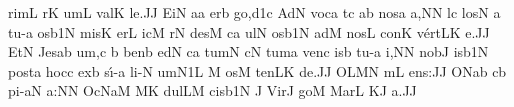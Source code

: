 \sgn rim\punctum L\egn
{}r\punctum K\egn
\sgn {}um\punctum L\egn
\spatium
\sgn v{a}l\punctum K\egn
\sgn le.\punctum J\augmentum J\egn
\spatium
\divisiofinalis
\spatium
\sgn {}Ei\punctum N\egn
\sgn {}a{}\punctum a\egn
\spatium
\sgn {}er\punctum b\egn
\sgn go,\episem d1\punctum c\egn
\spatium
\sgn {}Ad\punctum N\egn
\sgn voc\punctum a\egn
{}t\punctum c\egn
\sgn {}a{}\punctum b\egn
\spatium
\sgn n{o}s\punctum a\egn
{}a,\punctum N\augmentum N\egn
\spatium
\divisiominor
\spatium
l\punctum c\egn
\sgn los\punctum N\egn
\spatium
\custos a\lineaproxima
\sgn t{u}-\punctum a\egn
\sgn {}os\episem b1\punctum N\egn
\spatium
\sgn mis\punctum K\egn
\sgn {}er\punctum L\egn
\sgn {}ic\punctum M\egn
{}r\punctum N\egn
\sgn des\punctum M\egn
\spatium
{}c\punctum a\egn
\sgn {}ul\punctum N\egn
\sgn {}os\episem b1\punctum N\egn
\spatium
\virgula
\spatium
\sgn {}ad\punctum M\egn
\spatium
\sgn nos\punctum L\egn
\spatium
\sgn con\punctum K\egn
\sgn v{\'e}{rt}\clivis LK\egn
\sgn {}e.\punctum J\augmentum J\egn
\spatium
\divisiofinalis
\spatium
\sgn {}Et\punctum N\egn
\spatium
\sgn J{e}s\pes ab\egn
\sgn {}u{m,}\bivirga c\egn
\spatium
\custos b
\lineaproxima
\sgn ben\punctum b\egn
\sgn {}ed\punctum N\egn
\sgn {}{\'\i}c\punctum a\egn
\sgn tum\punctum N\egn
\spatium
{}c\punctum N\egn
\sgn tum\punctum a\egn
\spatium
\sgn v{e}n\punctum c\egn
{}is\punctum b\egn
\spatium
\sgn t{u}-\punctum a\egn
\sgn {}i,\punctum N\augmentum N\egn
\spatium
\divisiominor
\spatium
\sgn n{o}b\punctum J\egn
\sgn {}is\episem b1\punctum N\egn
\spatium
\sgn p{o}{st}\punctum a\egn
\spatium
\sgn hoc\punctum c\egn
\spatium
\sgn {}ex\punctum b\egn
\sgn s{\'\i}{-}\punctum a\egn
\sgn li{-}\punctum N\egn
\sgn {}um\episem N1\punctum L\egn
\spatium
\custos M\lineaproxima
\sgn {}os\punctum M\egn
\sgn ten\clivis LK\egn
\sgn de.\punctum J\augmentum J\egn
\spatium
\divisiofinalis
\spatium
\sgn {}O{}\quilismascandicus LMN\egn
\spatium
{}m\bivirga L\egn
\sgn {}e{ns:}\punctum J\augmentum J\egn
\spatium
\divisiofinalis
\spatium
\sgn {}O{}\quilismascandicus Nab%
\punctum c\nonspatium\punctum b\egn
\sgn p{i}{-}\clivis aN\egn
\sgn {}a{:}\punctum N\augmentum N\egn
\spatium
\divisiofinalis
\spatium
\sgn {}O{}\trivirga c\torculus NaM%
\clivis MK\egn
\spatium
\sgn d{u}l\pes LM\egn
\sgn cis\episem b1\punctum N\egn
\spatium
\divisiominor
\spatium
\custos J
\lineaproxima
\sgn V{i}r\punctum J\egn
\sgn go{}\punctum M\egn
\spatium
\sgn Mar\punctum L\egn
\sgn {}{\'\i}{-}\clivis KJ\egn
\sgn {}a.\punctum J\augmentum J\egn
\Finisgregoriana

